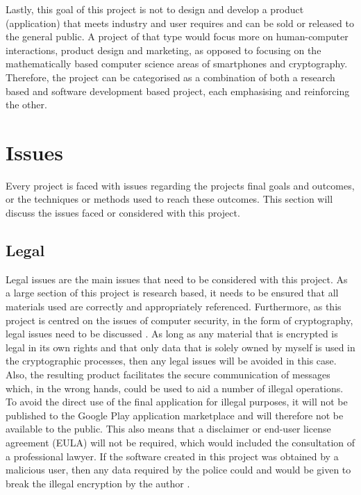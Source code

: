 \documentclass[a4paper,10pt]{report}
\begin{document}
Lastly, this goal of this project is not to design and develop a product (application) that meets industry and user requires and can be sold or released to the general public. A project of that type would focus more on human-computer interactions, product design and marketing, as opposed to focusing on the mathematically based computer science areas of smartphones and cryptography. Therefore, the project can be categorised as a combination of both a research based and software development based project, each emphasising and reinforcing the other. 

\section{Issues}

Every project is faced with issues regarding the projects final goals and outcomes, or the techniques or methods used to reach these outcomes. This section will discuss the issues faced or considered with this project. 

\subsection{Legal}

Legal issues are the main issues that need to be considered with this project. As a large section of this project is research based, it needs to be ensured that all materials used are correctly and appropriately referenced. Furthermore, as this project is centred on the issues of computer security, in the form of cryptography, legal issues need to be discussed \cite{dataprotect} \cite{internetlaw}. As long as any material that is encrypted is legal in its own rights and that only data that is solely owned by myself is used in the cryptographic processes, then any legal issues will be avoided in this case. Also, the resulting product facilitates the secure communication of messages which, in the wrong hands, could be used to aid a number of illegal operations. To avoid the direct use of the final application for illegal purposes, it will not be published to the Google Play application marketplace and will therefore not be available to the public. This also means that a disclaimer or end-user license agreement (EULA) will not be required, which would included the consultation of a professional lawyer. If the software created in this project was obtained by a malicious user, then any data required by the police could and would be given to break the illegal encryption by the author \cite{pcworldart}.
\end{document}
